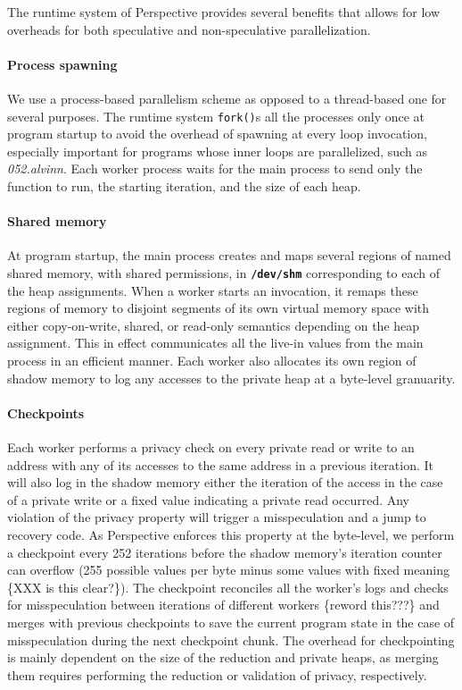 The runtime system of Perspective provides several benefits that allows for
low overheads for both speculative and non-speculative parallelization.

\paragraph{Process spawning}
We use a process-based parallelism scheme as opposed to a thread-based one
for several purposes. The runtime system \texttt{fork()}s all the processes
only once at program startup to avoid the overhead of spawning at every loop
invocation, especially important for programs whose inner loops are
parallelized, such as \textit{052.alvinn}. Each worker process waits for the main
process to send only the function to run, the starting iteration, and the
size of each heap.

\paragraph{Shared memory}
At program startup, the main process creates and maps several regions of named shared
memory, with shared permissions, in \texttt{\textbf{/dev/shm}} corresponding
to each of the heap assignments.
When a worker starts an invocation, it remaps these regions of memory to
disjoint segments of its own virtual memory space with either
copy-on-write, shared, or read-only semantics depending on the heap
assignment. This in effect communicates all the live-in values from the
main process in an efficient manner. Each worker also allocates its own
region of shadow memory to log any accesses to the private heap at a
byte-level granuarity.

\paragraph{Checkpoints}
Each worker performs a privacy check on every private read or write to an
address with any of its accesses to the same address in a previous
iteration. It will also log in the shadow memory either the iteration of the
access in the case of a private write or a fixed value indicating a
private read occurred. Any violation of the privacy property will trigger a
misspeculation and a jump to recovery code. As Perspective enforces this
property at the byte-level, we perform a checkpoint every 252 iterations
before the shadow memory's iteration counter can overflow (255 possible
values per byte minus some values with fixed meaning \{XXX is this
clear?\}). The checkpoint reconciles all the worker's logs and checks for
misspeculation between iterations of different workers \{reword this???\} and
merges with previous checkpoints to save the current program state in the
case of misspeculation during the next checkpoint chunk. The overhead for
checkpointing is mainly dependent on the size of the reduction and private heaps,
as merging them requires performing the reduction or validation of privacy,
respectively.

